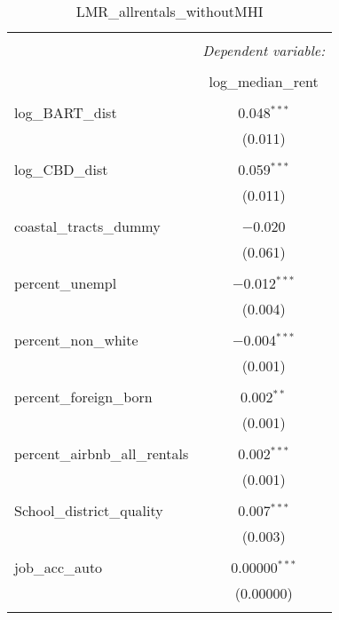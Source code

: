 \documentclass[10pt, letterpaper]{amsart}
\begin{document}
\begin{table}[!htbp] \centering 
  \caption{LMR\_allrentals\_withoutMHI} 
  \label{} 
  \begin{tabular}{@{\extracolsep{5pt}}lc} 
    \\[-1.8ex]\hline 
    \hline \\[-1.8ex] 
    & \multicolumn{1}{c}{\textit{Dependent variable:}} \\ 
    \cline{2-2} 
    \\[-1.8ex] & log\_median\_rent \\ 
    \hline \\[-1.8ex] 
    log\_BART\_dist & 0.048$^{***}$ \\ 
    & (0.011) \\ 
    & \\ 
    log\_CBD\_dist & 0.059$^{***}$ \\ 
    & (0.011) \\ 
    & \\ 
    coastal\_tracts\_dummy & $-$0.020 \\ 
    & (0.061) \\ 
    & \\ 
    percent\_unempl & $-$0.012$^{***}$ \\ 
    & (0.004) \\ 
    & \\ 
    percent\_non\_white & $-$0.004$^{***}$ \\ 
    & (0.001) \\ 
    & \\ 
    percent\_foreign\_born & 0.002$^{**}$ \\ 
    & (0.001) \\ 
    & \\ 
    percent\_airbnb\_all\_rentals & 0.002$^{***}$ \\ 
    & (0.001) \\ 
    & \\ 
    School\_district\_quality & 0.007$^{***}$ \\ 
    & (0.003) \\ 
    & \\ 
    job\_acc\_auto & 0.00000$^{***}$ \\ 
    & (0.00000) \\ 
    & \\ 

\end{tabular}
\end{table}
\end{document}
